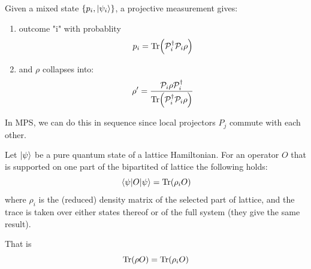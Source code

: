 \documentclass[11pt]{article}
\theoremstyle{remark}
\theoremstyle{definition}
\numberwithin{thm}{section}
\begin{document}
\vspace{+2cm}
Given a mixed state $\{p_i, \ket{\psi_i}\}$, a projective measurement gives:
\begin{enumerate}
	\item outcome "i" with probablity
		\begin{equation}
			p_i = \Tr(\mathcal{P}_i ^\dagger \mathcal{P}_i \rho)
		\end{equation}
	
	\item and $\rho$ collapses into:
		\begin{equation}
			\rho' = \frac{\mathcal{P}_i \rho \mathcal{P}_i^\dagger}{\Tr(\mathcal{P}_i^\dagger \mathcal{P}_i \rho)}
		\end{equation}
\end{enumerate}

In MPS, we can do this in sequence since local projectors $P_j$ commute with each other. 




























\break
	Let $\ket{\psi}$ be a pure quantum state of a lattice Hamiltonian. For an operator $O$ that is supported on one part of the bipartited of lattice the following holds: 
	\begin{equation}
		\mel{\psi}{O}{\psi} = \Tr(\rho_{i}O)
	\end{equation}
	where $\rho_{i}$ is the (reduced) density matrix of the selected part of lattice, and the trace is taken over either states thereof or of the full system (they give the same result).


That is
\begin{equation}
	\Tr(\rho O) = \Tr(\rho_i O)
\end{equation}





























%
\end{document}

